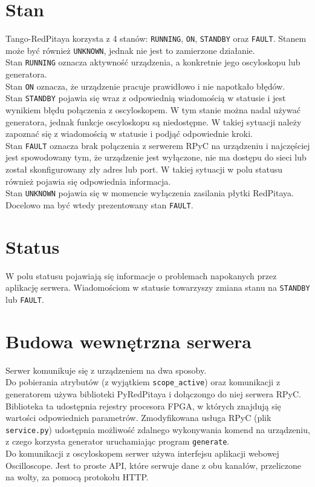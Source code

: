 \documentclass[12pt,a4paper]{article}
\begin{document}
	\section{Stan}
	Tango-RedPitaya korzysta z 4 stanów: \texttt{RUNNING}, \texttt{ON}, \texttt{STANDBY} oraz \texttt{FAULT}.
	Stanem może być również \texttt{UNKNOWN}, jednak nie jest to zamierzone działanie.\\
	Stan \texttt{RUNNING} oznacza aktywność urządzenia, a konkretnie jego oscyloskopu lub generatora.\\
	Stan \texttt{ON} oznacza, że urządzenie pracuje prawidłowo i nie napotkało błędów.\\
	Stan \texttt{STANDBY} pojawia się wraz z odpowiednią wiadomością w statusie i jest wynikiem błędu połączenia z oscyloskopem.
	W tym stanie można nadal używać generatora, jednak funkcje oscyloskopu są niedostępne. W takiej sytuacji należy zapoznać się z wiadomością w statusie i podjąć odpowiednie kroki.\\
	Stan \texttt{FAULT} oznacza brak połączenia z serwerem RPyC na urządzeniu i najczęściej jest spowodowany tym, że urządzenie jest wyłączone, nie ma dostępu do sieci lub został skonfigurowany zły adres lub port. W takiej sytuacji w polu statusu również pojawia się odpowiednia informacja.\\
	Stan \texttt{UNKNOWN} pojawia się w momencie wyłączenia zasilania płytki RedPitaya. Docelowo ma być wtedy prezentowany stan \texttt{FAULT}.

	\section{Status}
	W polu statusu pojawiają się informacje o problemach napokanych przez aplikację serwera. Wiadomościom w statusie towarzyszy zmiana stanu na \texttt{STANDBY} lub \texttt{FAULT}.

	\section{Budowa wewnętrzna serwera}
	Serwer komunikuje się z urządzeniem na dwa sposoby.\\
	Do pobierania atrybutów (z wyjątkiem \texttt{scope\_active}) oraz komunikacji z generatorem używa biblioteki PyRedPitaya i dołączongo do niej serwera RPyC.
	Biblioteka ta udostępnia rejestry procesora FPGA, w których znajdują się wartości odpowiednich parametrów.
	Zmodyfikowana usługa RPyC (plik \texttt{service.py}) udostępnia możliwość zdalnego wykonywania komend na urządzeniu, z czego korzysta generator uruchamiając program \texttt{generate}.\\
	Do komunikacji z oscyloskopem serwer używa interfejsu aplikacji webowej Oscilloscope. Jest to proste API, które serwuje dane z obu kanałów, przeliczone na wolty, za pomocą protokołu HTTP.
\end{document}
